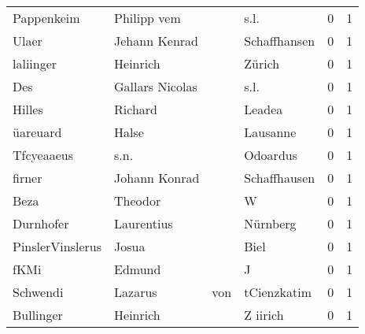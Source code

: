 \begin{center}
\begin{tiny}
\begin{longtabu}{llllrr}
               Pappenkeim &                        Philipp vem &             &                                        s.l. &          0 &         1 \\
                    Ulaer &                      Jehann Kenrad &             &                                Schaffhansen &          0 &         1 \\
                laliinger &                           Heinrich &             &                                      Zürich &          0 &         1 \\
                      Des &                    Gallars Nicolas &             &                                        s.l. &          0 &         1 \\
                   Hilles &                            Richard &             &                                      Leadea &          0 &         1 \\
                 üareuard &                              Halse &             &                                    Lausanne &          0 &         1 \\
               Tfcyeaaeus &                               s.n. &             &                                    Odoardus &          0 &         1 \\
                   firner &                      Johann Konrad &             &                                Schaffhausen &          0 &         1 \\
                     Beza &                            Theodor &             &                                           W &          0 &         1 \\
                Durnhofer &                         Laurentius &             &                                    Nürnberg &          0 &         1 \\
         PinslerVinslerus &                              Josua &             &                                        Biel &          0 &         1 \\
                     fKMi &                             Edmund &             &                                           J &          0 &         1 \\
                 Schwendi &                            Lazarus &         von &                                 tCienzkatim &          0 &         1 \\
                Bullinger &                           Heinrich &             &                                    Z iirich &          0 &         1 \\

\end{longtabu}
\end{tiny}
\end{center}

